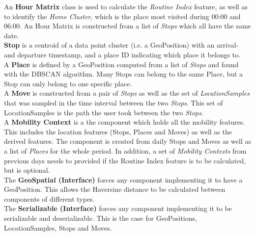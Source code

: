 An \textbf{Hour Matrix} class is used to calculate the \textit{Routine Index} feature, as well as to identify the \textit{Home Cluster}, which is the place most visited during 00:00 and 06:00. An Hour Matrix is constructed from a list of \textit{Stops} which all have the same date.\\

\textbf{Stop} is a centroid of a data point cluster (i.e. a GeoPosition) with an arrival- and departure timestamp, and a place ID indicating which place it belongs to.\\

A \textbf{Place} is defined by a GeoPosition computed from a list of \textit{Stops} and found with the DBSCAN algorithm. Many Stops can belong to the same Place, but a Stop can only belong to one specific place.\\

A \textbf{Move} is constructed from a pair of \textit{Stops} as well as the set of \textit{LocationSamples} that was sampled in the time interval between the two \textit{Stops}. This set of LocationSamples is the path the user took between the two \textit{Stops}.\\

A \textbf{Mobility Context} is a the component which holds all the mobility features. This includes the location features (Stops, Places and Moves) as well as the derived features. The component is created from daily Stops and Moves as well as a list of \textit{Places} for the whole period. In addition, a set of \textit{Mobility Contexts} from previous days needs to provided if the Routine Index feature is to be calculated, but is optional. \\

The \textbf{GeoSpatial (Interface)} forces any component implementing it to have a GeoPosition. This allows the Haversine distance to be calculated between components of different types.\\

The \textbf{Serializable (Interface)} forces any component implementing it to be serializable and deserializable. This is the case for GeoPositions, LocationSamples, Stops and Moves.

